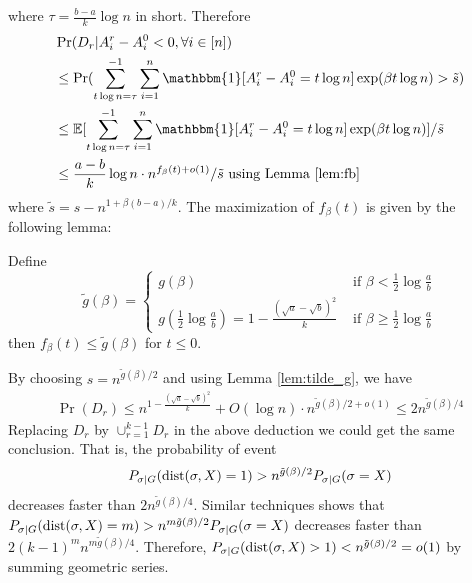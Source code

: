 \documentclass{article}
\begin{document}
where $\tau =\frac{b-a}{k}\log n$ in short. Therefore
\begin{align*}
&\Pr(D_r | A_i^r - A_i^0  < 0, \forall i\in [n])  \\
&\leq\Pr(\sum_{t\log n =\tau}^{-1}\sum_{i=1}^n \mathbbm{1}[A^r_i - A^0_i = t\log n]\exp ( \beta  t\log n)  > \tilde{s} ) \\
& \leq \mathbb{E}[\sum_{t\log n =\tau}^{-1}\sum_{i=1}^n \mathbbm{1}[A^r_i - A^0_i= t\log n]\exp ( \beta  t\log n)] /  \tilde{s} \\
& \leq \frac{a-b}{k}\log n \cdot n^{f_{\beta}(t) + o(1)} / \tilde{s} \textrm{ using Lemma \ref{lem:fb} }
\end{align*}
where $\tilde{s} = s - n^{1+\beta(b-a)/k}$. 
The maximization of $f_{\beta}(t)$ is given by the following lemma:
\begin{lemma}\label{lem:tilde_g}
	Define
	\begin{equation}\label{eq:gbt}
	\tilde{g}(\beta) = \begin{cases}
	g(\beta)   & \text{~if~} \beta< \frac{1}{2}\log\frac{a}{b} \\
	g(\frac{1}{2} \log\frac{a}{b}) = 1 - \frac{(\sqrt{a}-\sqrt{b})^2}{k} & \text{~if~} \beta\ge \frac{1}{2}\log\frac{a}{b}
	\end{cases}
	\end{equation}
	then $f_{\beta}(t) \leq \tilde{g}(\beta)$ for $t\leq 0$.
\end{lemma}
By choosing $s = n^{\tilde{g}(\beta)/2}$ and using Lemma \ref{lem:tilde_g}, we have
\begin{align*}
\Pr( D_r) \leq  n^{1-\frac{(\sqrt{a}-\sqrt{b})^2}{k}} + O(\log n)  \cdot n^{\tilde{g}(\beta)/2 + o(1)} \leq 2n^{\tilde{g}(\beta)/4}
\end{align*}
Replacing $D_r$ by $\cup_{r=1}^{k-1} D_r$ in the above deduction we could get the same conclusion.
That is, the probability of event
$$
P_{\sigma | G}(\operatorname{dist}(\sigma, X) = 1) > n^{\tilde{g}(\beta)/2}P_{\sigma | G}(\sigma = X)\label{eq:betastar_xx}
$$
decreases faster than $2n^{\tilde{g}(\beta)/4}$.
Similar techniques shows that $P_{\sigma | G}(\operatorname{dist}(\sigma, X) = m)> n^{m\tilde{g}(\beta)/2}P_{\sigma | G}(\sigma = X)$
decreases faster than $2(k-1)^m n^{m\tilde{g}(\beta)/4}$. Therefore, $P_{\sigma | G}(\operatorname{dist}(\sigma, X) > 1) < n^{\tilde{g}(\beta)/2} = o(1)$ by summing geometric series.
\end{document}
